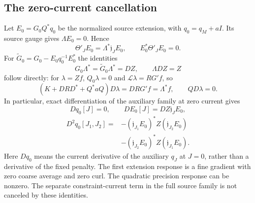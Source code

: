 \subsection{The zero-current cancellation}

Let $E_0=G_0Q^*q_0$ be the normalized source extension, with
$q_0=q_M+aI$. Its source gauge gives
$\Lambda E_0=0$. Hence
\[
 \Theta'_J E_0=\Lambda^*\mathfrak j_J E_0,
 \qquad E_0^*\Theta'_J E_0=0.
\]
For $\widetilde G_0=G_0-E_0q_0^{-1}E_0^*$ the identities
\begin{equation}\label{gauge-response-identities}
 G_0\Lambda^*=\widetilde G_0\Lambda^*=DZ,
 \qquad \Lambda DZ=Z
\end{equation}
follow directly: for $\lambda=Zf$,
$Q_0\lambda=0$ and $\mathcal L\lambda=RG'f$, so
\[
 (K+DRD^*+Q^*aQ)D\lambda=DRG'f=\Lambda^*f,
 \qquad QD\lambda=0.
\]
In particular, exact differentiation of the auxiliary family at
zero current gives
\[
 Dq_0[J]=0,\qquad DE_0[J]=DZ\mathfrak j_JE_0,
\]
\begin{equation}\label{gauge-current-hessian}
 \begin{split}
 D^2q_0[J_1,J_2]
 ={}&-(\mathfrak j_{J_1}E_0)^*Z(\mathfrak j_{J_2}E_0)\\
    &-(\mathfrak j_{J_2}E_0)^*Z(\mathfrak j_{J_1}E_0).
 \end{split}
\end{equation}
Here $Dq_0$ means the current derivative of the auxiliary $q_J$
at $J=0$, rather than a derivative of the fixed penalty. The first
extension response is a fine gradient with zero coarse average and
zero curl. The quadratic precision response can be nonzero.
The separate constraint-current term in the full source family
is not canceled by these identities.
